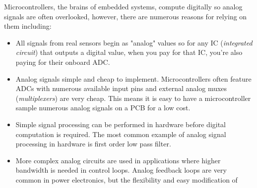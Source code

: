 \documentclass[main.tex]{subfiles}
\begin{document}
Microcontrollers, the brains of embedded systems, compute digitally so analog signals are often overlooked, however, there are numerous reasons for relying on them including: 
\begin{itemize}
    \item All signals from real sensors begin as "analog" values so for any IC (\textit{integrated circuit}) that outputs a digital value, when you pay for that IC, you're also paying for their onboard ADC.
    \item Analog signals simple and cheap to implement. Microcontrollers often feature ADCs with numerous available input pins and external analog muxes (\textit{multiplexers}) are very cheap. This means it is easy to have a microcontroller sample numerous analog signals on a PCB for a low cost.
    \item Simple signal processing can be performed in hardware before digital computation is required. The most common example of analog signal processing in hardware is first order low pass filter. 
    \item More complex analog circuits are used in applications where higher bandwidth is needed in control loops. Analog feedback loops are very common in power electronics, but the flexibility and easy modification of 
\end{itemize}


\end{document}
